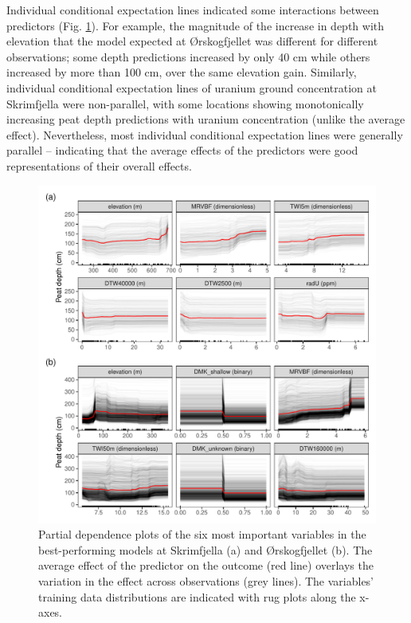 \documentclass[soil, manuscript]{copernicus}
\begin{document}
Individual conditional expectation lines indicated some interactions between predictors (Fig. \ref{fig:pdps}).
For example, the magnitude of the increase in depth with elevation that the model expected at Ørskogfjellet was different for different observations; some depth predictions increased by only 40 cm while others increased by more than 100 cm, over the same elevation gain.
Similarly, individual conditional expectation lines of uranium ground concentration at Skrimfjella were non-parallel, with some locations showing monotonically increasing peat depth predictions with uranium concentration (unlike the average effect).
Nevertheless, most individual conditional expectation lines were generally parallel -- indicating that the average effects of the predictors were good representations of their overall effects.

\begin{figure}
\includegraphics[width=1\linewidth]{figures/partial_dependence} \caption{Partial dependence plots of the six most important variables in the best-performing models at Skrimfjella (a) and Ørskogfjellet (b). The average effect of the predictor on the outcome (red line) overlays the variation in the effect across observations (grey lines). The variables' training data distributions are indicated with rug plots along the x-axes.}\label{fig:pdps}
\end{figure}
\end{document}
